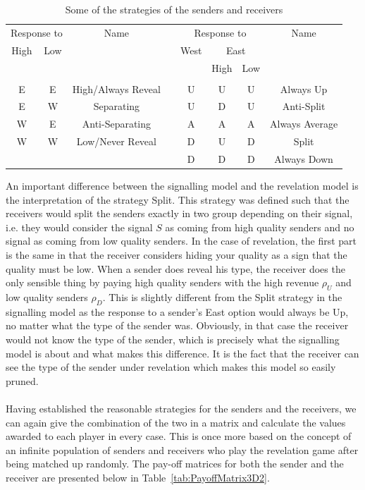 \documentclass[a4paper,10pt]{article}
\numberwithin{equation}{section}
\begin{document}
\begin{table}[h]
\begin{center}
\begin{tabular}{c|c|ccc|c|c|c}
\multicolumn{2}{c|}{Response to}&Name& \hspace{1cm} &\multicolumn{3}{c|}{Response to}&Name\\
High&Low&&&West&\multicolumn{2}{c|}{East}&\\
&&&&&High&Low&\\
\cline{1-3}
\cline{5-8}
&&&&&&\\[-.3cm]
E&E&High/Always Reveal&&U&U&U&Always Up\\
E&W&Separating&&U&D&U&Anti-Split\\
W&E&Anti-Separating&&A&A&A&Always Average\\
W&W&Low/Never Reveal&&D&U&D&Split\\
\multicolumn{3}{c}{}&&D&D&D&Always Down\\
\end{tabular}
\end{center}
\caption{Some of the strategies of the senders and receivers}
\label{tab:StrategiesRevelation}
\end{table}

An important difference between the signalling model and the revelation model is the interpretation of the strategy Split. This strategy was defined such that the receivers would split the senders exactly in two group depending on their signal, i.e. they would consider the signal $S$ as coming from high quality senders and no signal as coming from low quality senders. In the case of revelation, the first part is the same in that the receiver considers hiding your quality as a sign that the quality must be low. When a sender does reveal his type, the receiver does the only sensible thing by paying high quality senders with the high revenue $\rho_U$ and low quality senders $\rho_D$. This is slightly different from the Split strategy in the signalling model as the response to a sender's East option would always be Up, no matter what the type of the sender was. Obviously, in that case the receiver would not know the type of the sender, which is precisely what the signalling model is about and what makes this difference. It is the fact that the receiver can see the type of the sender under revelation which makes this model so easily pruned.\\
\\
Having established the reasonable strategies for the senders and the receivers, we can again give the combination of the two in a matrix and calculate the values awarded to each player in every case. This is once more based on the concept of an infinite population of senders and receivers who play the revelation game after being matched up randomly. The pay-off matrices for both the sender and the receiver are presented below in Table~\ref{tab:PayoffMatrix3D2}.
\end{document}
